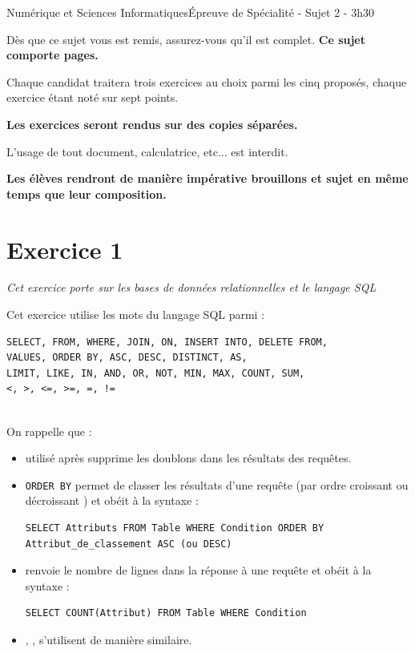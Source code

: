 \documentclass[11pt,a4paper,french,twoside]{PMCours}
\begin{document}
{Numérique et Sciences Informatiques}{Épreuve de Spécialité - Sujet 2 - 3h30}

\medskip
{\large Dès que ce sujet vous est remis, assurez-vous qu’il est complet.
\textbf{Ce sujet comporte \pageref{LastPage} pages.}

\medskip
Chaque candidat traitera trois exercices au choix parmi les cinq proposés, 
chaque exercice étant noté sur sept points.

\medskip
\textbf{Les exercices seront rendus sur des copies séparées.}

\medskip
L'usage de tout document, calculatrice, etc... est interdit.

\medskip
\textbf{Les élèves rendront de manière impérative brouillons et sujet en même temps que leur composition.}}

\newpage
\section*{Exercice 1}
\emph{Cet exercice porte sur les bases de données relationnelles et le langage SQL}

\medskip
Cet exercice utilise les mots du langage SQL parmi :
\begin{verbatim}
SELECT, FROM, WHERE, JOIN, ON, INSERT INTO, DELETE FROM, 
VALUES, ORDER BY, ASC, DESC, DISTINCT, AS,
LIMIT, LIKE, IN, AND, OR, NOT, MIN, MAX, COUNT, SUM,
<, >, <=, >=, =, !=
\end{verbatim} 
\ \\
On rappelle que :
\begin{itemize}
\item {} utilisé après  supprime les doublons dans les résultats des requêtes.
\item \verb'ORDER BY' permet de classer les résultats d'une requête (par ordre croissant  ou décroissant ) et obéit à la syntaxe : 
\begin{verbatim}
SELECT Attributs FROM Table WHERE Condition ORDER BY Attribut_de_classement ASC (ou DESC)
\end{verbatim}
\item {} renvoie le nombre de lignes dans la réponse à une requête et obéit à la syntaxe :
\begin{verbatim}
SELECT COUNT(Attribut) FROM Table WHERE Condition
\end{verbatim}
\item {}, ,  s'utilisent de manière similaire.
\end{itemize}
\end{document}
